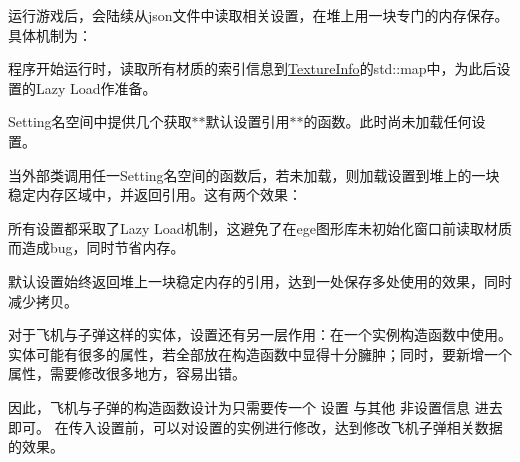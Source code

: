运行游戏后，会陆续从json文件中读取相关设置，在堆上用一块专门的内存保存。具体机制为：
\begin{DoxyItemize}
\item 程序开始运行时，读取所有材质的索引信息到\hyperlink{struct_settings_1_1_texture_info}{Texture\+Info}的std\+::map中，为此后设置的\+Lazy Load作准备。
\item Setting名空间中提供几个获取$\ast$$\ast$默认设置引用$\ast$$\ast$的函数。此时尚未加载任何设置。
\item 当外部类调用任一\+Setting名空间的函数后，若未加载，则加载设置到堆上的一块稳定内存区域中，并返回引用。这有两个效果：
\begin{DoxyItemize}
\item 所有设置都采取了\+Lazy Load机制，这避免了在ege图形库未初始化窗口前读取材质而造成bug，同时节省内存。
\item 默认设置始终返回堆上一块稳定内存的引用，达到一处保存多处使用的效果，同时减少拷贝。
\end{DoxyItemize}
\end{DoxyItemize}





对于飞机与子弹这样的实体，设置还有另一层作用：在一个实例构造函数中使用。 实体可能有很多的属性，若全部放在构造函数中显得十分臃肿；同时，要新增一个属性，需要修改很多地方，容易出错。

因此，飞机与子弹的构造函数设计为只需要传一个 {\ttfamily 设置} 与其他 {\ttfamily 非设置信息} 进去即可。 在传入设置前，可以对设置的实例进行修改，达到修改飞机子弹相关数据的效果。 